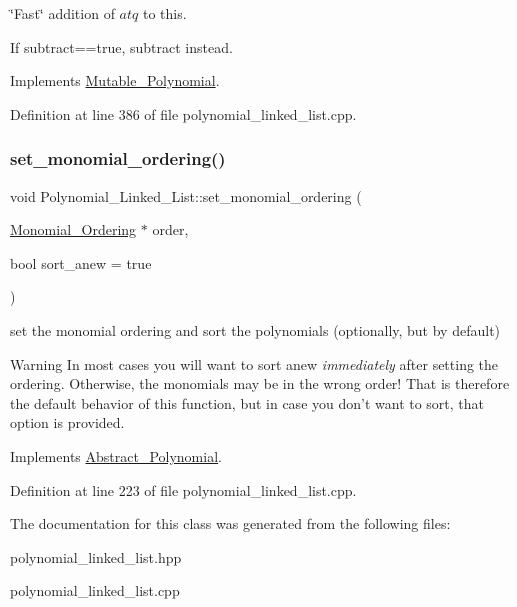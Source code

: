 \char`\"{}\+Fast\char`\"{} addition of $atq$ to {\ttfamily this}. 

If {\ttfamily subtract==true}, subtract instead. 

Implements \hyperlink{class_mutable___polynomial_add21309f55af6a58e1d9b1623a0bb09a}{Mutable\+\_\+\+Polynomial}.



Definition at line 386 of file polynomial\+\_\+linked\+\_\+list.\+cpp.

\mbox{\label{class_polynomial___linked___list_a150055edb9ec7b59ec3217fb7f411e6e}} 
\subsubsection{\texorpdfstring{set\+\_\+monomial\+\_\+ordering()}{set\_monomial\_ordering()}}
{\footnotesize\ttfamily void Polynomial\+\_\+\+Linked\+\_\+\+List\+::set\+\_\+monomial\+\_\+ordering (\begin{DoxyParamCaption}\item[{\hyperlink{class_monomial___ordering}{Monomial\+\_\+\+Ordering} $\ast$}]{order,  }\item[{bool}]{sort\+\_\+anew = {\ttfamily true} }\end{DoxyParamCaption})\hspace{0.3cm}{\ttfamily [virtual]}}



set the monomial ordering and sort the polynomials (optionally, but by default) 

\begin{DoxyWarning}{Warning}
In most cases you will want to sort anew {\itshape immediately} after setting the ordering. Otherwise, the monomials may be in the wrong order! That is therefore the default behavior of this function, but in case you don't want to sort, that option is provided. 
\end{DoxyWarning}


Implements \hyperlink{class_abstract___polynomial_ad783804725a64f09fff6eeec058afe98}{Abstract\+\_\+\+Polynomial}.



Definition at line 223 of file polynomial\+\_\+linked\+\_\+list.\+cpp.



The documentation for this class was generated from the following files\+:\begin{DoxyCompactItemize}
\item 
polynomial\+\_\+linked\+\_\+list.\+hpp\item 
polynomial\+\_\+linked\+\_\+list.\+cpp\end{DoxyCompactItemize}
